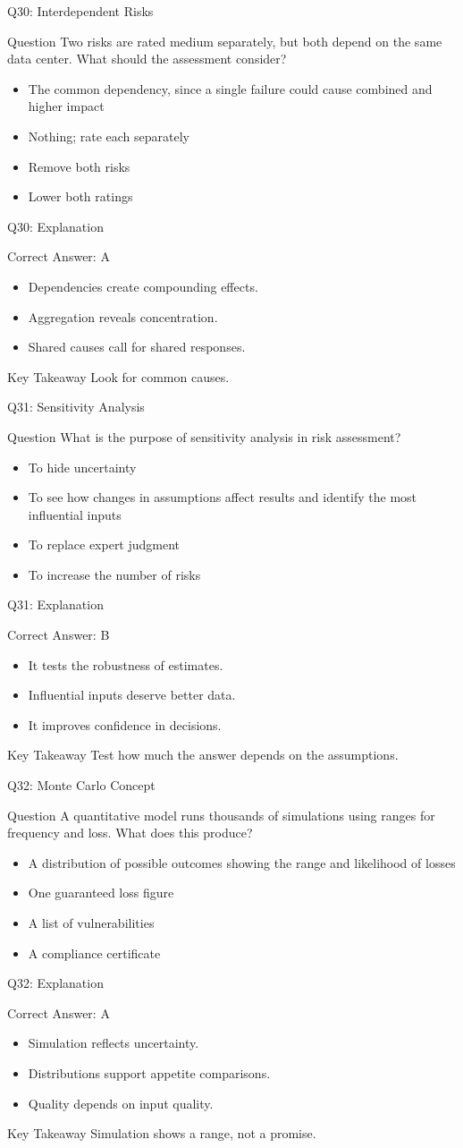 \documentclass[aspectratio=169]{beamer}
\newcommand{\hq}[7]{%
	\begin{frame}{Q#1: #2}
		\begin{block}{Question}
			#3
		\end{block}
		\begin{itemize}
			#4
		\end{itemize}
	\end{frame}
	\begin{frame}{Q#1: Explanation}
		\begin{block}{Correct Answer: #5}
			\begin{itemize}
				#6
			\end{itemize}
		\end{block}
		\begin{alertblock}{Key Takeaway}
			#7
		\end{alertblock}
	\end{frame}
}
\begin{document}
	\hq{30}{Interdependent Risks}
	{Two risks are rated medium separately, but both depend on the same data center. What should the assessment consider?}
	{\item[\textbf{(A)}] The common dependency, since a single failure could cause combined and higher impact
		\item[\textbf{(B)}] Nothing; rate each separately
		\item[\textbf{(C)}] Remove both risks
		\item[\textbf{(D)}] Lower both ratings}
	{A}
	{\item Dependencies create compounding effects.
		\item Aggregation reveals concentration.
		\item Shared causes call for shared responses.}
	{Look for common causes.}
	
	\hq{31}{Sensitivity Analysis}
	{What is the purpose of sensitivity analysis in risk assessment?}
	{\item[\textbf{(A)}] To hide uncertainty
		\item[\textbf{(B)}] To see how changes in assumptions affect results and identify the most influential inputs
		\item[\textbf{(C)}] To replace expert judgment
		\item[\textbf{(D)}] To increase the number of risks}
	{B}
	{\item It tests the robustness of estimates.
		\item Influential inputs deserve better data.
		\item It improves confidence in decisions.}
	{Test how much the answer depends on the assumptions.}
	
	\hq{32}{Monte Carlo Concept}
	{A quantitative model runs thousands of simulations using ranges for frequency and loss. What does this produce?}
	{\item[\textbf{(A)}] A distribution of possible outcomes showing the range and likelihood of losses
		\item[\textbf{(B)}] One guaranteed loss figure
		\item[\textbf{(C)}] A list of vulnerabilities
		\item[\textbf{(D)}] A compliance certificate}
	{A}
	{\item Simulation reflects uncertainty.
		\item Distributions support appetite comparisons.
		\item Quality depends on input quality.}
	{Simulation shows a range, not a promise.}
	
\end{document}
